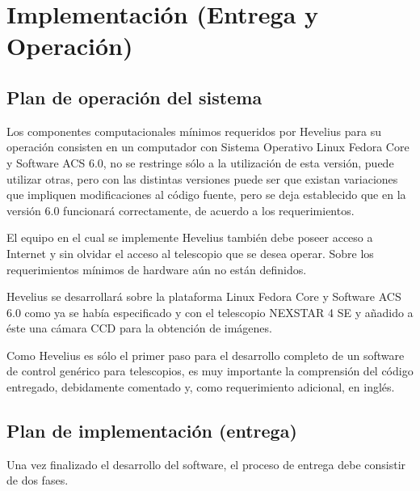 \documentclass[letterpaper,titlepage,spanish,10pt]{article}
\begin{document}
\newpage
\section{Implementaci\'on (Entrega y Operaci\'on)} %
\subsection{Plan de operaci\'on del sistema}
Los componentes computacionales m\'inimos requeridos por Hevelius para su 
operaci\'on consisten en un computador con Sistema Operativo Linux Fedora Core 
y Software ACS 6.0, no se restringe s\'olo a la utilizaci\'on de esta versi\'on, puede 
utilizar otras, pero con las distintas versiones puede ser que existan variaciones 
que impliquen modificaciones al c\'odigo fuente, pero se deja 
establecido que en la versi\'on 6.0 funcionar\'a correctamente, de acuerdo 
a los requerimientos.

El equipo en el cual se implemente Hevelius tambi\'en debe poseer acceso 
a Internet y sin olvidar el acceso al telescopio que se desea operar. Sobre 
los requerimientos m\'inimos de hardware a\'un no est\'an definidos.

Hevelius se desarrollar\'a sobre la plataforma Linux Fedora Core y Software ACS 6.0 como 
ya se hab\'ia especificado y con el telescopio NEXSTAR 4 SE y a\~nadido 
a \'este una c\'amara CCD para la obtenci\'on de im\'agenes.

Como Hevelius es s\'olo el primer paso para el desarrollo completo de un 
software de control gen\'erico para telescopios, es muy importante la 
comprensi\'on del c\'odigo entregado, debidamente comentado y, como requerimiento 
adicional, en ingl\'es.

\subsection{Plan de implementaci\'on (entrega)}
Una vez finalizado el desarrollo del software, el proceso de entrega debe 
consistir de dos fases.
\end{document}
